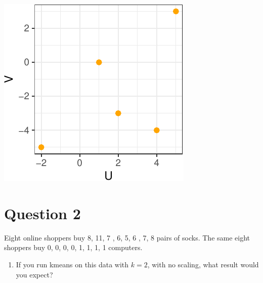 \documentclass[]{article}
\providecommand{\tightlist}{%
  \setlength{\itemsep}{0pt}\setlength{\parskip}{0pt}}
\begin{document}
\begin{center}\includegraphics{sol_A1_files/figure-latex/unnamed-chunk-2-3} \end{center}

\hypertarget{question-2}{%
\section{Question 2}\label{question-2}}

Eight online shoppers buy 8, 11, 7 , 6, 5, 6 , 7, 8 pairs of socks. The
same eight shoppers buy 0, 0, 0, 0, 1, 1, 1, 1 computers.

\begin{enumerate}
\def\labelenumi{\alph{enumi})}
\tightlist
\item
  If you run kmeans on this data with \(k = 2\), with no scaling, what
  result would you expect?
\end{enumerate}
\end{document}
